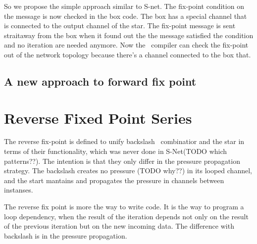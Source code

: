 So we propose the simple approach similar to S-net. The fix-point condition on the message is now checked in the box code. The box has a special channel that is connected to the output channel of the star. The fix-point message is sent straitaway from the box when it found out the the message satisfied the condition and no iteration are needed anymore. Now the \ak\ compiler can check the fix-point out of the network topology because there's a channel connected to the box that.


    \subsection{A new approach to forward fix point}
%



    \section{Reverse Fixed Point Series\label{rfp}}
The reverse fix-point is defined to unify backslash \ combinatior and the star in terms of their functionality, which was never done in S-Net(TODO which patterns??). The intention is that they only differ in the pressure propagation strategy. The backslash creates no pressure (TODO why??) in its looped channel, and the start mantains and propagates the pressure in channels between instanses.

%
%
%
%

The reverse fix point is more the way to write code. It is the way to program a loop dependency, when the result of the iteration depends not only on the result of the previous iteration but on the new incoming data. The difference with backslash is in the pressure propagation.

